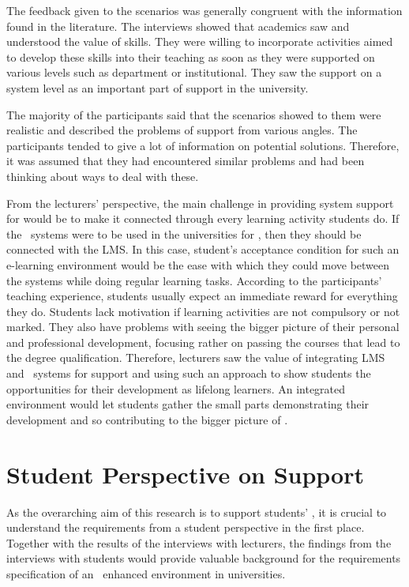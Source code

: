 The feedback given to the scenarios was generally congruent with the information
found in the literature. The interviews showed that academics saw and understood
the value of \LLLs skills. They were willing to incorporate activities aimed to
develop these skills into their teaching as soon as they were supported on
various levels such as department or institutional. They saw the support on a
system level as an important part of \LLLs support in the university.

The majority of the participants said that the scenarios showed to them were
realistic and described the problems of \LLLs support from various angles. The
participants tended to give a lot of information on potential solutions.
Therefore, it was assumed that they had encountered similar problems and had
been thinking about ways to deal with these.

From the lecturers' perspective, the main challenge in providing system support
for \LLLs would be to make it connected through every learning activity students
do. If the \ep~systems were to be used in the universities for \LLLsn, then they
should be connected with the LMS. In this case, student's acceptance condition
for such an e-learning environment would be the ease with which they could move
between the systems while doing regular learning tasks. According to the
participants' teaching experience, students usually expect an immediate reward
for everything they do. Students lack motivation if learning activities are not
compulsory or not marked. They also have problems with seeing the bigger picture
of their personal and professional development, focusing rather on passing the
courses that lead to the degree qualification. Therefore, lecturers saw the
value of integrating LMS and \ep~systems for \LLLs support and using such
an approach to show students the opportunities for their development as lifelong
learners. An integrated environment would let students gather the small parts
demonstrating their development and so contributing to the bigger picture of
\LLLsn.

\section{Student Perspective on \LLLc Support}

As the overarching aim of this research is to support students' \LLLsn, it is
crucial to understand the requirements from a student perspective in the first
place. Together with the results of the interviews with lecturers, the findings
from the interviews with students would provide valuable background for the
requirements specification of an \ep~enhanced environment in universities.

